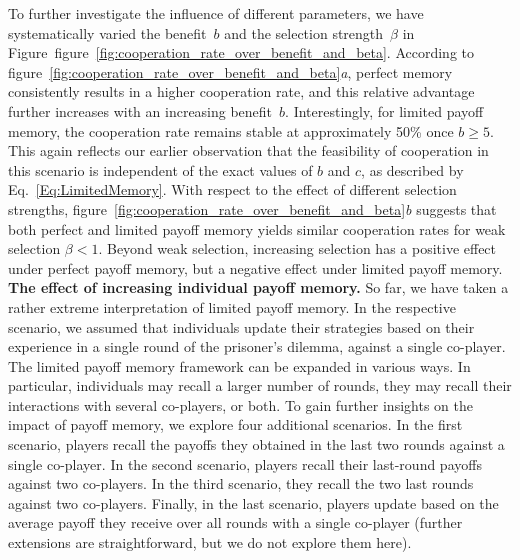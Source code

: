 \documentclass[11pt]{article}
\newcommand{\FigDependenceParameters}{figure~\ref{fig:cooperation_rate_over_benefit_and_beta}}
\theoremstyle{plainCl1}
\theoremstyle{plainCl2}
\begin{document}

To further investigate the influence of different parameters, we have systematically varied the benefit~$b$ and the selection strength~$\beta$ in Figure~\FigDependenceParameters.
According to \FigDependenceParameters{\it a}, perfect memory consistently results in a higher cooperation rate, and this relative advantage further increases with an increasing benefit~$b$. 
Interestingly, for limited payoff memory, the cooperation rate remains stable at approximately 50\% once \(b \!\ge\! 5\).
This again reflects our earlier observation that the feasibility of cooperation in this scenario is independent of the exact values of $b$ and $c$, as described by Eq.~\eqref{Eq:LimitedMemory}. 
With respect to the effect of different selection strengths, \FigDependenceParameters{\it b} suggests that both perfect and limited payoff memory yields similar cooperation rates for weak selection \(\beta \!<\! 1\). 
Beyond weak selection, increasing selection has a positive effect under perfect payoff memory, but a negative effect under limited payoff memory.\\



\noindent 
{\bf The effect of increasing individual payoff memory.}
So far, we have taken a rather extreme interpretation of limited payoff memory. 
In the respective scenario, we assumed that individuals update their strategies based on their experience in a single round of the prisoner's dilemma, against a single co-player. 
The limited payoff memory framework can be expanded in various ways. 
In particular, individuals may recall a larger number of rounds, they may recall their interactions with several co-players, or both. 
To gain further insights on the impact of payoff memory, we explore four additional scenarios. 
In the first scenario, players recall the payoffs they obtained in the last two rounds against a single co-player. 
In the second scenario, players recall their last-round payoffs against two co-players. 
In the third scenario, they recall the two last rounds against two co-players. 
Finally, in the last scenario, players update based on the average payoff they
receive over all rounds with a single co-player (further extensions are straightforward, but we do not explore them here).

\end{document}
